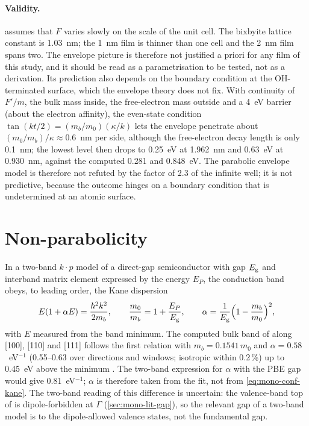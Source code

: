 \paragraph{Validity.}  assumes that $F$ varies slowly on the scale of the unit cell. The
bixbyite lattice constant is 1.03~nm; the 1~nm film is thinner than one cell and the 2~nm film spans two. The envelope
picture is therefore not justified a priori for any film of this study, and it should be read as a parametrisation to
be tested, not as a derivation. Its prediction also depends on the boundary condition at the OH-terminated surface,
which the envelope theory does not fix. With continuity of $F'/m$, the bulk mass inside, the free-electron mass outside
and a 4~eV barrier (about the electron affinity), the even-state condition $\tan(kt/2) = (m_b/m_0)(\kappa/k)$ lets the
envelope penetrate about $(m_0/m_b)/\kappa \approx 0.6$~nm per side, although the free-electron decay length is only
0.1~nm; the lowest level then drops to 0.25~eV at 1.962~nm and 0.63~eV at 0.930~nm, against the computed 0.281 and
0.848~eV. The parabolic envelope model is therefore not refuted by the factor of 2.3 of the infinite well; it is not
predictive, because the outcome hinges on a boundary condition that is undetermined at an atomic surface.

\section{Non-parabolicity}
\label{sec:mono-conf-kane}

In a two-band $k\cdot p$ model of a direct-gap semiconductor with gap $E_{\mathrm{g}}$ and interband matrix element expressed by
the energy $E_P$, the conduction band obeys, to leading order, the Kane dispersion \citep{Kane1957}
\begin{equation}
E(1+\alpha E) = \frac{\hbar^2k^2}{2m_b}, \qquad \frac{m_0}{m_b} = 1 + \frac{E_P}{E_{\mathrm{g}}},\qquad
\alpha = \frac{1}{E_{\mathrm{g}}}\Big(1-\frac{m_b}{m_0}\Big)^2 ,
\label{eq:mono-conf-kane}
\end{equation}
with $E$ measured from the band minimum. The computed bulk band of \InO{} along [100], [110] and [111] follows the
first relation with $m_b = 0.1541\,m_0$ and $\alpha = 0.58$~eV$^{-1}$ (0.55--0.63 over directions and windows;
isotropic within 0.2\,\%) up to 0.45~eV above the minimum  . The two-band expression for $\alpha$
with the PBE gap would give 0.81~eV$^{-1}$; $\alpha$ is therefore taken from the fit, not from
\cref{eq:mono-conf-kane}. The two-band reading of this difference is uncertain: the valence-band top of \InO{} is
dipole-forbidden at $\Gamma$ (\cref{sec:mono-lit-gap}), so the relevant gap of a two-band model is to the dipole-allowed
valence states, not the fundamental gap.

